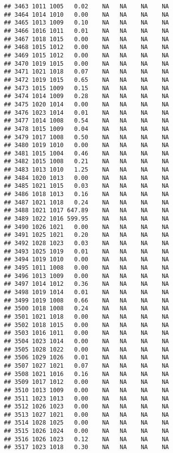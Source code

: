 \documentclass{article}\usepackage{graphicx, color}
\makeatletter
\newenvironment{kframe}{%
 \def\at@end@of@kframe{}%
 \ifinner\ifhmode%
  \def\at@end@of@kframe{\end{minipage}}%
  \begin{minipage}{\columnwidth}%
 \fi\fi%
 \def\FrameCommand##1{\hskip\@totalleftmargin \hskip-\fboxsep
 \colorbox{shadecolor}{##1}\hskip-\fboxsep
     \hskip-\linewidth \hskip-\@totalleftmargin \hskip\columnwidth}%
 \MakeFramed {\advance\hsize-\width
   \@totalleftmargin\z@ \linewidth\hsize
   \@setminipage}}%
 {\par\unskip\endMakeFramed%
 \at@end@of@kframe}
\newenvironment{knitrout}{}{} %
\makeatother
\begin{document}
\begin{knitrout}
\begin{kframe}
\begin{verbatim}
## 3463 1011 1005   0.02    NA   NA    NA    NA
## 3464 1014 1010   0.00    NA   NA    NA    NA
## 3465 1013 1009   0.10    NA   NA    NA    NA
## 3466 1016 1011   0.01    NA   NA    NA    NA
## 3467 1018 1015   0.00    NA   NA    NA    NA
## 3468 1015 1012   0.00    NA   NA    NA    NA
## 3469 1015 1012   0.00    NA   NA    NA    NA
## 3470 1019 1015   0.00    NA   NA    NA    NA
## 3471 1021 1018   0.07    NA   NA    NA    NA
## 3472 1019 1015   0.65    NA   NA    NA    NA
## 3473 1015 1009   0.15    NA   NA    NA    NA
## 3474 1014 1009   0.28    NA   NA    NA    NA
## 3475 1020 1014   0.00    NA   NA    NA    NA
## 3476 1023 1014   0.01    NA   NA    NA    NA
## 3477 1014 1008   0.54    NA   NA    NA    NA
## 3478 1015 1009   0.04    NA   NA    NA    NA
## 3479 1017 1008   0.50    NA   NA    NA    NA
## 3480 1019 1010   0.00    NA   NA    NA    NA
## 3481 1015 1004   0.46    NA   NA    NA    NA
## 3482 1015 1008   0.21    NA   NA    NA    NA
## 3483 1013 1010   1.25    NA   NA    NA    NA
## 3484 1020 1013   0.00    NA   NA    NA    NA
## 3485 1021 1015   0.03    NA   NA    NA    NA
## 3486 1018 1013   0.16    NA   NA    NA    NA
## 3487 1021 1018   0.24    NA   NA    NA    NA
## 3488 1021 1017 647.89    NA   NA    NA    NA
## 3489 1022 1016 599.95    NA   NA    NA    NA
## 3490 1026 1021   0.00    NA   NA    NA    NA
## 3491 1025 1021   0.20    NA   NA    NA    NA
## 3492 1028 1023   0.03    NA   NA    NA    NA
## 3493 1025 1019   0.01    NA   NA    NA    NA
## 3494 1019 1010   0.00    NA   NA    NA    NA
## 3495 1011 1008   0.00    NA   NA    NA    NA
## 3496 1013 1009   0.00    NA   NA    NA    NA
## 3497 1014 1012   0.36    NA   NA    NA    NA
## 3498 1019 1014   0.01    NA   NA    NA    NA
## 3499 1019 1008   0.66    NA   NA    NA    NA
## 3500 1018 1008   0.24    NA   NA    NA    NA
## 3501 1021 1018   0.00    NA   NA    NA    NA
## 3502 1018 1015   0.00    NA   NA    NA    NA
## 3503 1016 1011   0.00    NA   NA    NA    NA
## 3504 1023 1014   0.00    NA   NA    NA    NA
## 3505 1028 1022   0.00    NA   NA    NA    NA
## 3506 1029 1026   0.01    NA   NA    NA    NA
## 3507 1027 1021   0.07    NA   NA    NA    NA
## 3508 1021 1016   0.16    NA   NA    NA    NA
## 3509 1017 1012   0.00    NA   NA    NA    NA
## 3510 1013 1009   0.00    NA   NA    NA    NA
## 3511 1023 1013   0.00    NA   NA    NA    NA
## 3512 1026 1023   0.00    NA   NA    NA    NA
## 3513 1027 1021   0.00    NA   NA    NA    NA
## 3514 1028 1025   0.00    NA   NA    NA    NA
## 3515 1026 1024   0.00    NA   NA    NA    NA
## 3516 1026 1023   0.12    NA   NA    NA    NA
## 3517 1023 1018   0.30    NA   NA    NA    NA

\end{verbatim}
\end{kframe}
\end{knitrout}
\end{document}
